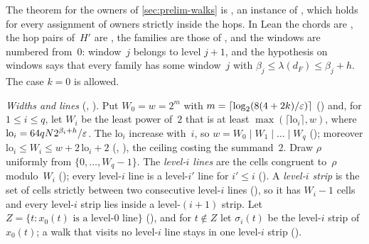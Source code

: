 \begin{outline}
The theorem for the owners of \cref{sec:prelim-walks} is , an instance of , which
holds for every assignment of owners strictly inside the hops. In Lean the chords are , the hop pairs of~$H'$ are
, the families are those of , and the windows are numbered from~$0$: window~$j$ belongs to
level $j+1$, and the hypothesis on windows says that every family has some window~$j$ with
$\beta_j\le\lambda(d_F)\le\beta_j+h$. The case $k=0$ is allowed.

\emph{Widths and lines} (, ). Put $W_0=w=2^m$ with $m=\lceil\log_2(8(4+2k)/\varepsilon)\rceil$
() and, for $1\le i\le q$, let $W_i$ be the least power of~$2$ that is at least
$\max(\lceil\mathrm{lo}_i\rceil,w)$, where $\mathrm{lo}_i=64qN2^{\beta_i+h}/\varepsilon$. The $\mathrm{lo}_i$ increase with~$i$, so
$w=W_0\mid W_1\mid\dots\mid W_q$ (); moreover $\mathrm{lo}_i\le W_i\le w+2\,\mathrm{lo}_i+2$
(, ), the ceiling costing the summand~$2$. Draw $\rho$ uniformly from
$\{0,\dots,W_q-1\}$. The \emph{level-$i$ lines} are the cells congruent to~$\rho$ modulo~$W_i$ (); every
level-$i$ line is a level-$i'$ line for $i'\le i$ (). A \emph{level-$i$ strip} is the set of cells strictly
between two consecutive level-$i$ lines (), so it has $W_i-1$ cells and every level-$i$ strip lies inside a
level-$(i+1)$ strip. Let $Z=\{t:x_0(t)\text{ is a level-}0\text{ line}\}$ (), and for $t\notin Z$ let
$\sigma_i(t)$ be the level-$i$ strip of $x_0(t)$; a walk that visits no level-$i$ line stays in one level-$i$ strip
().


\end{outline}
